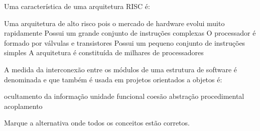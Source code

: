 \documentclass[12pt, addpoints]{exam}
\begin{document}
    \begin{questions}

    \newpage
    \question
Uma característica de uma arquitetura RISC é:
\begin{choices}
\choice Uma arquitetura de alto risco pois o mercado de hardware evolui muito rapidamente
\choice Possui um grande conjunto de instruções complexas
\choice O processador é formado por válvulas e transistores
\choice Possui um pequeno conjunto de instruções simples
\choice A arquitetura é constituída de milhares de processadores
\end{choices}

\question
A medida da interconexão entre os módulos de uma estrutura de software é denominada e que também é usada em projetos orientados a objetos é: 
\begin{choices}
\choice ocultamento da informação
\choice unidade funcional
\choice coesão
\choice abstração procedimental
\choice acoplamento
\end{choices}

\question
Marque a alternativa onde todos os conceitos estão corretos.


\end{questions}
\end{document}
